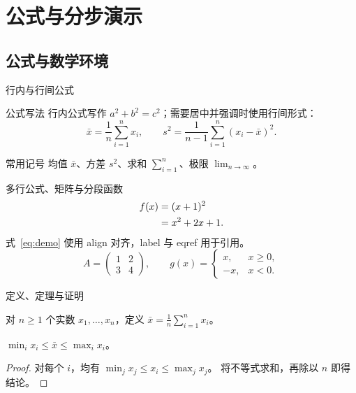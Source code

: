 \section{公式与分步演示}
\subsection{公式与数学环境}
\begin{frame}{行内与行间公式}
  \begin{block}{公式写法}
    行内公式写作 $a^2+b^2=c^2$；需要居中并强调时使用行间形式：
    \[
      \bar{x}=\frac{1}{n}\sum_{i=1}^{n}x_i,\qquad
      s^2=\frac{1}{n-1}\sum_{i=1}^{n}(x_i-\bar{x})^2 .
    \]
  \end{block}

  \begin{exampleblock}{常用记号}
    均值 $\bar{x}$、方差 $s^2$、求和 $\sum_{i=1}^{n}$、极限 $\lim_{n\to\infty}$。
  \end{exampleblock}
\end{frame}

\begin{frame}{多行公式、矩阵与分段函数}
  \begin{align}
    \label{eq:demo} f(x) &= (x+1)^2 \\
         &= x^2+2x+1.\notag
  \end{align}
  式~\eqref{eq:demo} 使用 align 对齐，label 与 eqref 用于引用。
  \[
    A=\begin{pmatrix}1&2\\3&4\end{pmatrix},\qquad
    g(x)=\begin{cases}x,&x\geq0,\\-x,&x<0.\end{cases}
  \]
\end{frame}

\begin{frame}{定义、定理与证明}
  \begin{definition}[样本均值]
    对 $n\geq1$ 个实数 $x_1,\ldots,x_n$，定义
    $\bar{x}=\frac{1}{n}\sum_{i=1}^{n}x_i$。
  \end{definition}

  \begin{theorem}[均值界]
    $\min_i x_i\leq\bar{x}\leq\max_i x_i$。
  \end{theorem}

  \begin{proof}
    对每个 $i$，均有 $\min_j x_j\leq x_i\leq\max_j x_j$。
    将不等式求和，再除以 $n$ 即得结论。
  \end{proof}
\end{frame}

